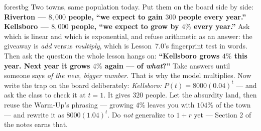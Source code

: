 \documentclass[10pt]{article}
\begin{document}
\begin{skillbox}[Hook]{forestbg}
    Two towns, same population today. Put them on the board side by side: \textbf{Riverton --- $8{,}000$
    people, ``we expect to gain $300$ people every year.''} \textbf{Kellsboro --- $8{,}000$ people,
    ``we expect to grow by $4\%$ every year.''} Ask which is linear and which is exponential, and
    refuse arithmetic as an answer: the giveaway is \emph{add} versus \emph{multiply}, which is
    Lesson~7.0's fingerprint test in words. Then ask the question the whole lesson hangs on:
    \textbf{``Kellsboro grows $4\%$ this year. Next year it grows $4\%$ again --- of \emph{what}?''}
    Take answers until someone says \emph{of the new, bigger number}. That is why the model
    multiplies. Now write the trap on the board deliberately: \emph{Kellsboro:} $P(t)=8000(0.04)^{t}$
    --- and ask the class to check it at $t=1$. It gives $320$ people. Let the absurdity land, then
    reuse the Warm-Up's phrasing --- growing $4\%$ leaves you with $104\%$ of the town --- and
    rewrite it as $8000(1.04)^{t}$. Do \emph{not}
    generalize to $1+r$ yet --- Section 2 of the notes earns that.
\end{skillbox}
\end{document}
